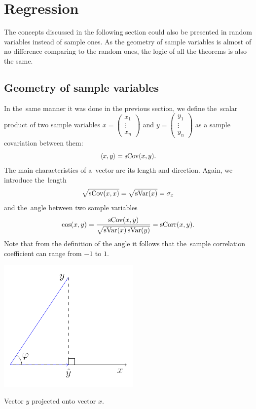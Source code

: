 \section{Regression}

The concepts discussed in the following section could also be presented in
random variables instead of sample ones. As the geometry of sample variables
is almost of no difference comparing to the random ones, the logic of
all the theorems is also the same.


\subsection{Geometry of sample variables}


In the~same manner it was done in the previous section, we define
the~scalar product of two sample variables
$x =
\begin{pmatrix}
x_1 \\
\vdots \\
x_n
\end{pmatrix}$
and
$y =
\begin{pmatrix}
y_1 \\
\vdots \\
y_n
\end{pmatrix}$
as a sample covariation between them:
\[
\langle x, y \rangle = \operatorname{sCov}(x, y).
\]
The main characteristics of a~vector are its length and direction.
Again, we introduce the~length
\[
\sqrt{\operatorname{sCov}(x,x)} = \sqrt{\operatorname{sVar}(x)} = \sigma_x
\]
and the~angle between two sample variables
\[
\cos(x,y) = \frac{\operatorname{sCov}(x,y)}{\sqrt{\operatorname{sVar}(x)\operatorname{sVar}(y)}} = \operatorname{sCorr}(x,y).
\]
Note that from the definition of the angle
it follows that the~sample correlation coefficient can range from $-1$ to $1$.

\begin{marginfigure}
\includegraphics[scale=0.85]{figures/02_basic_projection.pdf}
\caption{Vector $y$ projected onto vector $x$.}
\label{fig:corr_proj}
\end{marginfigure}


